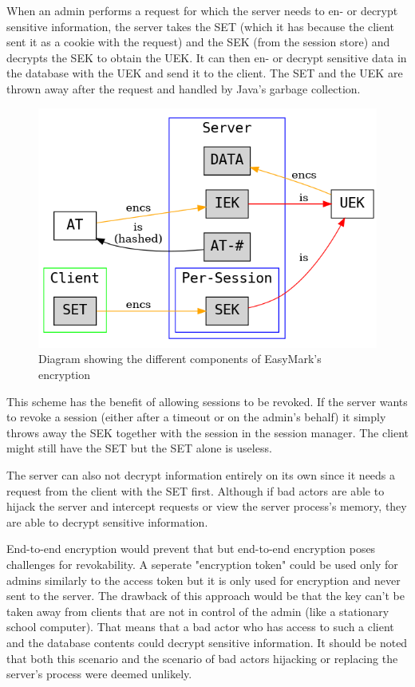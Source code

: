\documentclass[12pt,a4paper,oneside]{report}
\begin{document}
	When an admin performs a request for which the server needs to en- or decrypt sensitive information, the server takes the SET (which it has because the client sent it as a cookie with the request) and the SEK (from the session store) and decrypts the SEK to obtain the UEK. It can then en- or decrypt sensitive data in the database with the UEK and send it to the client. The SET and the UEK are thrown away after the request and handled by Java's garbage collection.

	\begin{figure}[H]
		\centering
		\includegraphics[width=.7\textwidth]{easymark_encryption.png}
		\vskip0pt
		\caption{Diagram showing the different components of EasyMark's encryption}
	\end{figure}

	This scheme has the benefit of allowing sessions to be revoked. If the server wants to revoke a session (either after a timeout or on the admin's behalf) it simply throws away the SEK together with the session in the session manager. The client might still have the SET but the SET alone is useless.

	The server can also not decrypt information entirely on its own since it needs a request from the client with the SET first. Although if bad actors are able to hijack the server and intercept requests or view the server process's memory, they are able to decrypt sensitive information.

	End-to-end encryption would prevent that but end-to-end encryption poses challenges for revokability. A seperate "encryption token" could be used only for admins similarly to the access token but it is only used for encryption and never sent to the server. The drawback of this approach would be that the key can't be taken away from clients that are not in control of the admin (like a stationary school computer). That means that a bad actor who has access to such a client and the database contents could decrypt sensitive information. It should be noted that both this scenario and the scenario of bad actors hijacking or replacing the server's process were deemed unlikely.
\end{document}
